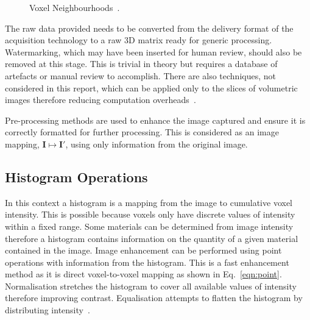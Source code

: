 \documentclass[journal]{IEEEtran}
\begin{document}
\begin{figure}[!htb]
	\centering
\caption{Voxel Neighbourhoods~\cite{lohmann1998volumetric}.}
\label{fig:neighbourhood}
\end{figure}


The raw data provided needs to be converted from the delivery format of the acquisition technology to a raw 3D matrix ready for generic processing.
Watermarking, which may have been inserted for human review, should also be removed at this stage. 
This is trivial in theory but requires a database of artefacts or manual review to accomplish.
There are also techniques, not considered in this report, which can be applied only to the slices of volumetric images therefore reducing computation overheads~\cite{harauz86exact}.

Pre-processing methods are used to enhance the image captured and ensure it is correctly formatted for further processing.
This is considered as an image mapping, $\textbf{I} \mapsto \textbf{I}'$, using only information from the original image.

\subsection{Histogram Operations}

In this context a histogram is a mapping from the image to cumulative voxel intensity.
This is possible because voxels only have discrete values of intensity within a fixed range.
Some materials can be determined from image intensity therefore a histogram contains information on the quantity of a given material contained in the image.
Image enhancement can be performed using point operations with information from the histogram.
This is a fast enhancement method as it is direct voxel-to-voxel mapping as shown in Eq.~\eqref{eqn:point}. 
Normalisation stretches the histogram to cover all available values of intensity therefore improving contrast.
Equalisation attempts to flatten the histogram by distributing intensity~\cite{nixon02feature}.
\end{document}
